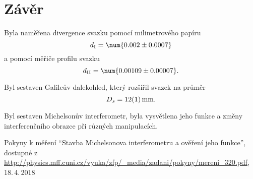 \documentclass{protokol}
\begin{document}
  \section*{Závěr}

    Byla naměřena divergence svazku pomocí milimetrového papíru
    $$ d_\text{I} = \num{0.002 \pm 0.0007} $$
    a pomocí měřiče profilu svazku 
    $$ d_\text{II} = \num{0.00109 \pm 0.00007}. $$

    Byl sestaven Galileův dalekohled, který rozšířil svazek na průměr
    $$ D_s = \SI{12 \pm 1}{mm}. $$

    Byl sestaven Michelsonův interferometr, byla vysvětlena jeho funkce a změny interferenčního obrazce při různých manipulacích.

  \begin{thebibliography}{}
 
    Pokyny k měření ``Stavba Michelsonova interferometru a ověření jeho funkce'', dostupné z\\ \url{http://physics.mff.cuni.cz/vyuka/zfp/_media/zadani/pokyny/mereni_320.pdf}, 18.\,4.\,2018
   
  \end{thebibliography}
\end{document}

